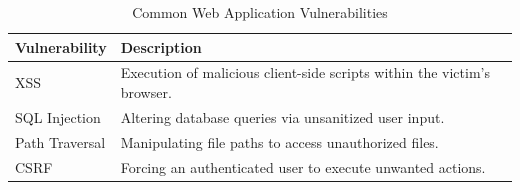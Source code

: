 \begin{table}[h!]
    \centering
    \begin{tabular}{|l|p{10cm}|}
        \hline
        \textbf{Vulnerability} & \textbf{Description} \\ \hline
        XSS & Execution of malicious client-side scripts within the victim's browser. \\ \hline
        SQL Injection & Altering database queries via unsanitized user input. \\ \hline
        Path Traversal & Manipulating file paths to access unauthorized files. \\ \hline
        CSRF & Forcing an authenticated user to execute unwanted actions. \\ \hline
    \end{tabular}
    \caption{Common Web Application Vulnerabilities}
    \label{tab:web_vulns}
\end{table}
